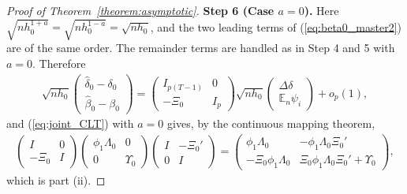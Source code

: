 \documentclass{article}
\newcommand{\E}{\mathbb{E}}
\begin{document}
\begin{appendices}
\begin{proof}[Proof of Theorem~\ref{theorem:asymptotic}]
\textbf{Step 6 (Case $a=0$).}
Here $\sqrt{nh_0^{1+a}}=\sqrt{nh_0^{1-a}}=\sqrt{nh_0}$, and the two leading
terms of (\ref{eq:beta0_master2}) are of the same order. The remainder terms
are handled as in Step 4 and 5 with $a=0$. Therefore
\begin{align*}
    \sqrt{nh_0}\begin{pmatrix}\hat{\delta}_0-\delta_0\\ \hat{\beta}_0-\beta_0\end{pmatrix}
    = \begin{pmatrix}I_{p(T-1)} & 0\\ -\Xi_0 & I_p\end{pmatrix}
      \sqrt{nh_0}\begin{pmatrix}\Delta\delta\\ \E_n\psi_i\end{pmatrix}
      + o_p(1),
\end{align*}
and (\ref{eq:joint_CLT}) with $a=0$ gives, by the continuous mapping theorem,
\begin{align*}
    \begin{pmatrix}I&0\\-\Xi_0&I\end{pmatrix}
    \begin{pmatrix}\phi_1\Lambda_0&0\\0&\Upsilon_0\end{pmatrix}
    \begin{pmatrix}I&-\Xi_0'\\0&I\end{pmatrix}
    =\begin{pmatrix}
        \phi_1\Lambda_0 & -\phi_1\Lambda_0\Xi_0'\\
        -\Xi_0\phi_1\Lambda_0 & \Xi_0\phi_1\Lambda_0\Xi_0'+\Upsilon_0
    \end{pmatrix},
\end{align*}
which is part (ii).



\end{proof}
\end{appendices}
\end{document}
